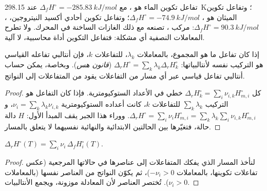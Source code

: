 \begin{example}\label{ex:b2:reaction-enthalpy:formation}
تفاعل تكوين الماء هو ، مع
$\Delta_f H^\circ = \qty{-285.83}{kJ/mol}$ عند \qty{298.15}{K}؛ وتفاعل تكوين
الميثان هو ، $\Delta_f H^\circ =
\qty{-74.9}{kJ/mol}$؛ وتفاعل تكوين أحادي أكسيد النيتروجين، ، $\Delta_f H^\circ = \qty{+90.3}{kJ/mol}$: مركب ،
تصنعه مع ذلك الغازات الساخنة في المحرك. ولا تطرح المعاملات النصفية أي
مشكلة: فتفاعل التكوين أداة محاسبية، لا آلية.
\end{example}

\begin{theorem}[قانون هس]\label{thm:b2:reaction-enthalpy:hess}
إذا كان تفاعل ما هو المجموع، بالمعاملات $\lambda_k$، للتفاعلات $k$، فإن
أنتالبي تفاعله القياسي هو التركيب نفسه لأنتالبياتها:
$\Delta_r H^\circ = \sum_k\lambda_k\Delta_r H_k^\circ$
(\emph{قانون هس}). وبخاصة، يمكن حساب أنتالبي تفاعل قياسي
عبر أي مسار من التفاعلات يقود من المتفاعلات إلى النواتج.
\end{theorem}

\begin{proof}
كل $\Delta_r H_k^\circ = \sum_i\nu_{i,k}H_{m,i}^\circ$ خطي في الأعداد
الستوكيومترية. فإذا كان التفاعل هو التركيب $\sum_k\lambda_k$ للتفاعلات
$k$، كانت أعداده الستوكيومترية $\nu_i = \sum_k\lambda_k
\nu_{i,k}$، و$\Delta_r H^\circ = \sum_i\nu_iH_{m,i}^\circ = \sum_k\lambda_k
\sum_i\nu_{i,k}H_{m,i}^\circ$. ووراء هذا الجبر يقف المبدأ الأول: $H$ دالة
حالة، فتغيّرها بين الحالتين الابتدائية والنهائية نفسيهما لا يتعلق
بالمسار.
\end{proof}

\begin{proposition}\label{prop:b2:reaction-enthalpy:formation-sum}
$\Delta_r H^\circ(T) = \sum_i\nu_i\,\Delta_f H_i^\circ(T)$.
\end{proposition}

\begin{proof}
لنأخذ المسار الذي يفكك المتفاعلات إلى عناصرها في حالاتها المرجعية (عكس
تفاعلات تكوينها، بالمعاملات $-\nu_i > 0$)، ثم يكوّن النواتج من العناصر
نفسها (بالمعاملات $\nu_i > 0$). تُختصر العناصر لأن المعادلة موزونة،
ويجمع  الأنتالبيات.
\end{proof}


